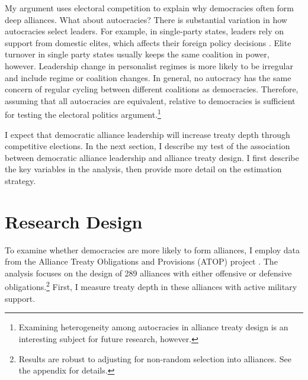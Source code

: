 \documentclass[12pt]{article}
\begin{document}
My argument uses electoral competition to explain why democracies often form deep alliances. 
What about autocracies? 
There is substantial variation in how autocracies select leaders. 
For example, in single-party states, leaders rely on support from domestic elites, which affects their foreign policy decisions \citep{Weeks2014}.
Elite turnover in single party states usually keeps the same coalition in power, however.  
Leadership change in personalist regimes is more likely to be irregular and include regime or coalition changes.   
In general, no autocracy has the same concern of regular cycling between different coalitions as democracies.
Therefore, assuming that all autocracies are equivalent, relative to democracies is sufficient for testing the electoral politics argument.\footnote{Examining heterogeneity among autocracies in alliance treaty design is an interesting subject for future research, however.} 


I expect that democratic alliance leadership will increase treaty depth through competitive elections. 
In the next section, I describe my test of the association between democratic alliance leadership and alliance treaty design. 
I first describe the key variables in the analysis, then provide more detail on the estimation strategy.



\section{Research Design}



To examine whether democracies are more likely to form alliances, I employ data from the Alliance Treaty Obligations and Provisions (ATOP) project \citep{Leedsetal2002}. 
The analysis focuses on the design of 289 alliances with either offensive or defensive obligations.\footnote{Results are robust to adjusting for non-random selection into alliances. See the appendix for details.}
First, I measure treaty depth in these alliances with active military support. 
\end{document}
